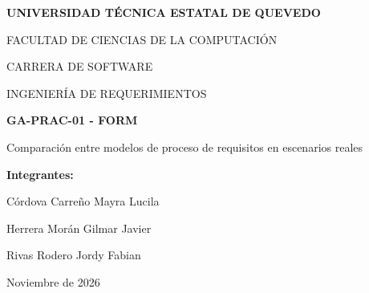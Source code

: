 \documentclass[12pt,a4paper]{article}
\begin{document}
\begin{titlepage}
\centering

{\bfseries UNIVERSIDAD TÉCNICA ESTATAL DE QUEVEDO\par}
\vspace{0.7cm}

FACULTAD DE CIENCIAS DE LA COMPUTACIÓN\par
CARRERA DE SOFTWARE\par
INGENIERÍA DE REQUERIMIENTOS\par

\vfill

{\Large\bfseries GA-PRAC-01 - FORM\par}
\vspace{0.5cm}

{\large Comparación entre modelos de proceso de requisitos en escenarios reales\par}

\vspace{1cm}

\textbf{Integrantes:}\par
Córdova Carreño Mayra Lucila\par
Herrera Morán Gilmar Javier\par
Rivas Rodero Jordy Fabian\par

\vfill

Noviembre de 2026\par

\end{titlepage}

\tableofcontents
\clearpage










\end{document}
